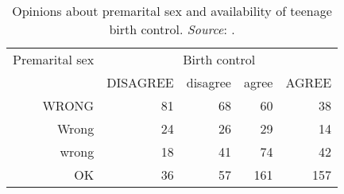 \begin{table}[ht]
\centering
\caption{Opinions about premarital sex and availability of teenage birth control. 
  \emph{Source}: \citet[Table 10.3]{Agresti:2013}.}
\label{tab:birthcontrol}
\begin{tabular}{rrrrr}
  \hline
  Premarital sex & \multicolumn{4}{c}{Birth control} \\
                 & DISAGREE & disagree & agree & AGREE \\ 
  \hline
  WRONG & 81 & 68 & 60 & 38 \\ 
  Wrong & 24 & 26 & 29 & 14 \\ 
  wrong & 18 & 41 & 74 & 42 \\ 
  OK & 36 & 57 & 161 & 157 \\ 
   \hline
\end{tabular}
\end{table} 
